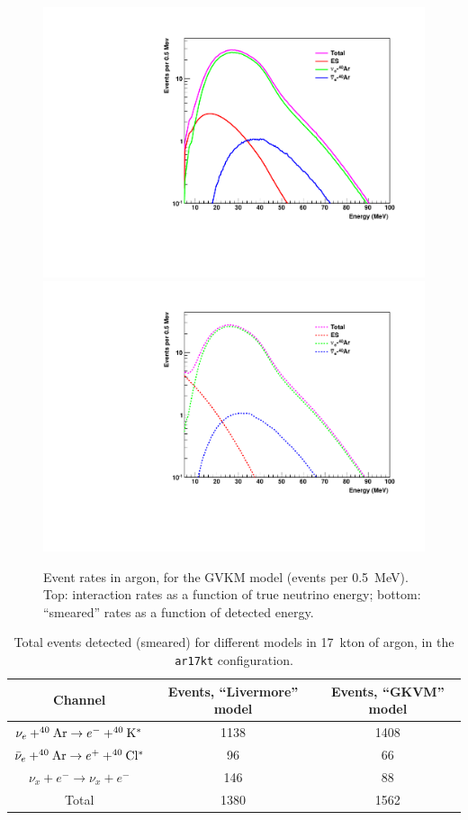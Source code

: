 \documentclass[12pt]{article}
\begin{document}
\begin{figure}[htb]
  \centering\includegraphics[width=.75\textwidth]{interaction_rates_gvkm_ar17kt.pdf}
  \centering\includegraphics[width=.75\textwidth]{smeared_rates_gvkm_ar17kt.pdf}

  \caption{Event rates in argon, for the GVKM model (events per 0.5~MeV). Top: interaction rates as a
    function of true neutrino energy; bottom:  ``smeared''
    rates as a function of detected energy.}
  \label{fig:larrates}
\end{figure}


\begin{table}[h]
\centering
\begin{tabular}{|c|c|c|} \hline
Channel & Events, ``Livermore'' model & Events, ``GKVM'' model  \\
\hline

$\nu_e + ^{40}{\rm Ar} \rightarrow e^- + ^{40}{\rm K^*}$ & 1138  & 1408 \\

$\bar{\nu}_e + ^{40}{\rm Ar} \rightarrow e^+ + ^{40}{\rm Cl^*}$ & 96& 66\\

$\nu_x + e^- \rightarrow \nu_x + e^-$                           & 146 &   88\\

\hline

Total &  1380 & 1562 \\ \hline
\end{tabular}
\caption{Total events detected (smeared) for different models in 17~kton of argon, in the \texttt{ar17kt} configuration.}
\label{tab:lartable}
\end{table}
\end{document}
